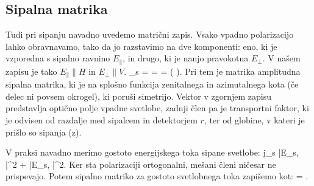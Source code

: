 \subsection*{Sipalna matrika}
Tudi pri sipanju navadno uvedemo matrični zapis. Vsako vpadno polarizacijo lahko obravnavamo, tako
da jo razstavimo na dve komponenti: eno, ki je vzporedna s sipalno ravnino $E_\parallel$, in drugo, ki 
je nanjo pravokotna $E_\perp$. V našem zapisu je tako $E_\parallel \parallel H$ in
$E_\perp \parallel V$. 
\beq
{}_s = 
\left[\begin{array}{c}
E_{s,H}\\
E_{s,V}\\
\end{array}\right]
=  = 
\left[\begin{array}{cc}
S_2 & S_3 \\
S_4 & S_1\\
\end{array}\right] 
\left(
\right)\!\!.
\label{eq:07_14}
\eeq
Pri tem je matrika amplitudna sipalna matrika, ki je na splošno funkcija zenitalnega
in azimutalnega kota (če delec ni povsem okrogel), ki poruši simetrijo. Vektor v zgornjem
zapisu predstavlja optično polje vpadne svetlobe, zadnji člen pa je transportni faktor,
ki je odvisen od razdalje med sipalcem in detektorjem $r$, ter od globine, v kateri
je prišlo so sipanja (z).

V praksi navadno merimo gostoto energijskega toka sipane svetlobe:
\beq
j_s \propto |E_{s, \parallel}|^2 + |E_{s, \perp}|^2.
\label{eq:07_15}
\eeq
Ker sta polarizaciji ortogonalni, mešani členi ničesar ne prispevajo. Potem sipalno matriko
za gostoto svetlobnega toka zapišemo kot:
\beq
{} = 
\left[\begin{array}{cc}
|S_2|^2& 0\\
0 & |S_1|^2\\
\end{array}\right] 
\!\!.
\label{eq:07_16}
\eeq

